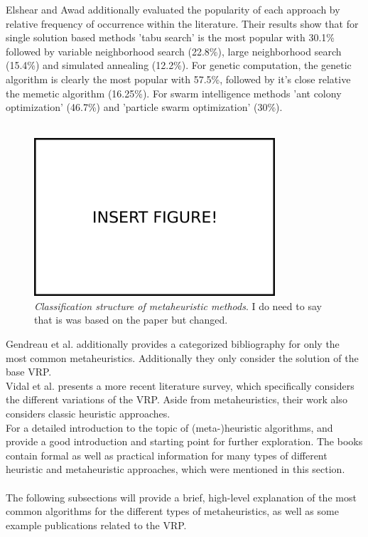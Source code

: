 Elshear and Awad additionally evaluated the popularity of each approach by relative frequency of occurrence within the literature. Their results show that for single solution based methods 'tabu search' is the most popular with 30.1\% followed by variable neighborhood search (22.8\%), large neighborhood search (15.4\%) and simulated annealing (12.2\%). For genetic computation, the genetic algorithm is clearly the most popular with 57.5\%, followed by it's close relative the memetic algorithm (16.25\%). For swarm intelligence methods 'ant colony optimization' (46.7\%) and 'particle swarm optimization' (30\%).\\ \\
\begin{figure}
\centering
\includegraphics[width=0.8\textwidth]{img/insert_figure_here.png}
\caption[Structure of metaheuristic methods]{\label{fig:metaheuristics} \textit{Classification structure of metaheuristic methods}. I do need to say that is was based on the paper but changed.}
\end{figure}
Gendreau et al. \cite{gendreau_metaheuristics_2008} additionally provides a categorized bibliography for only the most common metaheuristics. Additionally they only consider the solution of the base VRP.\\
Vidal et al. \cite{vidal_heuristics_2013} presents a more recent literature survey, which specifically considers the different variations of the VRP. Aside from metaheuristics, their work also considers classic heuristic approaches.\\ 
For a detailed introduction to the topic of (meta-)heuristic algorithms, \cite{marti_handbook_2018} and \cite{gendreau_handbook_2019} provide a good introduction and starting point for further exploration. The books contain formal as well as practical information for many types of different heuristic and metaheuristic approaches, which were mentioned in this section.\\ \\
The following subsections will provide a brief, high-level explanation of the most common algorithms for the different types of metaheuristics, as well as some example publications related to the VRP.

